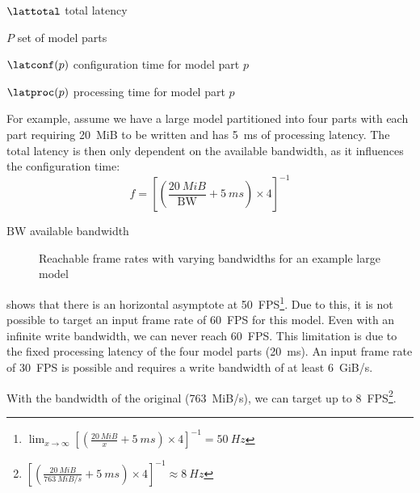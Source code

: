 \begin{eqexpl}[15mm]
    \item{$\lattotal$} total latency
    \item{$P$} set of model parts
    \item{$\latconf(p)$} configuration time for model part $p$
    \item{$\latproc(p)$} processing time for model part $p$
\end{eqexpl}

For example, assume we have a large model partitioned into four parts with each part requiring \SI{20}{MiB} to be written and has \SI{5}{ms} of processing latency.
The total latency is then only dependent on the available bandwidth, as it influences the configuration time:
\begin{equation*}
    f = \left[ \left( \frac{\SI{20}{MiB}}{\textrm{BW}} + \SI{5}{ms} \right) \times 4 \right]^{-1}
\end{equation*}

\begin{eqexpl}[15mm]
    \item{$\textrm{BW}$} available bandwidth
\end{eqexpl}

\begin{figure}
    \centering
    
    \caption{Reachable frame rates with varying bandwidths for an example large model}
    \label{fig:large_model_bandwidth_analysis_example}
\end{figure}

 shows that there is an horizontal asymptote at \SI{50}{FPS}\footnote{ $\lim_{x \to \infty} \left[ \left( \frac{\SI{20}{MiB}}{x} + \SI{5}{ms} \right) \times 4 \right]^{-1} = \SI{50}{Hz}$}.
Due to this, it is not possible to target an input frame rate of \SI{60}{FPS} for this model.
Even with an infinite write bandwidth, we can never reach \SI{60}{FPS}.
This limitation is due to the fixed processing latency of the four model parts (\SI{20}{ms}).
An input frame rate of \SI{30}{FPS} is possible and requires a write bandwidth of at least \SI{6}{GiB/s}.

With the bandwidth of the original \confignoc{} (\SI{763}{MiB/s}), we can target up to \SI{8}{FPS}\footnote{$\left[ \left( \frac{\SI{20}{MiB}}{\SI{763}{MiB/s}} + \SI{5}{ms} \right) \times 4 \right]^{-1} \approx \SI{8}{Hz}$}.

